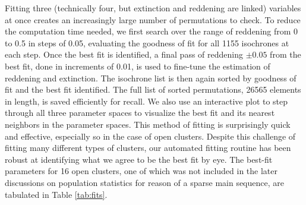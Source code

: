 \documentclass[onecolumn,table,xcdraw,super]{aastex631}
\begin{document}
Fitting three (technically four, but extinction and reddening are linked) variables at once creates an increasingly large number of permutations to check. To reduce the computation time needed, we first search over the range of reddening from 0 to 0.5 in steps of 0.05, evaluating the goodness of fit for all 1155 isochrones at each step. Once the best fit is identified, a final pass of reddening $\pm 0.05$ from the best fit, done in increments of 0.01, is used to fine-tune the estimation of reddening and extinction. The isochrone list is then again sorted by goodness of fit and the best fit identified. The full list of sorted permutations, 26565 elements in length, is saved efficiently for recall. We also use an interactive plot to step through all three parameter spaces to visualize the best fit and its nearest neighbors in the parameter spaces. This method of fitting is surprisingly quick and effective, especially so in the case of open clusters. Despite this challenge of fitting many different types of clusters, our automated fitting routine has been robust at identifying what we agree to be the best fit by eye. The best-fit parameters for 16 open clusters, one of which was not included in the later discussions on population statistics for reason of a sparse main sequence, are tabulated in Table \ref{tab:fits}.
\end{document}
